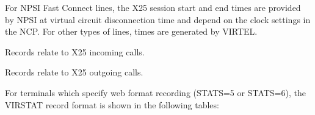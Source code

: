 \documentclass[letterpaper,10pt,english]{sphinxmanual}
\begin{document}
\begin{sphinxVerbatim}[commandchars=\\\{\}]
                
               
               
            
               
             
                 
\end{sphinxVerbatim}

\sphinxAtStartPar
{}

\sphinxAtStartPar
For NPSI Fast Connect lines, the X25 session start and end times are provided by NPSI at virtual circuit disconnection time and depend on the clock settings in the NCP. For other types of lines, times are     generated by VIRTEL.
\begin{description}
\sphinxAtStartPar
Records relate to X25 incoming calls.

\sphinxAtStartPar
Records relate to X25 outgoing calls.

\end{description}

\sphinxAtStartPar
For terminals which specify web format recording (STATS=5 or STATS=6), the VIRSTAT record format is shown in the following  tables:
\end{document}
